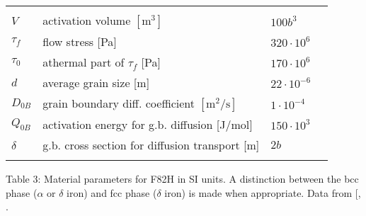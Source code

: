 \documentclass[letterpaper,10pt,english]{jupyterBook}
\begin{document}
\begin{savenotes}
\begin{tabulary}{\linewidth}[t]{TTTT}
			\sphinxAtStartPar
			\sphinxhyphen{}
			\\
			\sphinxhline
			\sphinxAtStartPar
			\(V\)
			&
			\sphinxAtStartPar
			activation volume \(\left[\mathrm{m}^3\right]\)
			&
			\sphinxAtStartPar
			\(100b^3\)
			&
			\sphinxAtStartPar
			\sphinxhyphen{}
			\\
			\sphinxhline
			\sphinxAtStartPar
			\(\tau_f\)
			&
			\sphinxAtStartPar
			flow stress {[}Pa{]}
			&
			\sphinxAtStartPar
			\(320 \cdot 10^{6}\)
			&
			\sphinxAtStartPar
			\sphinxhyphen{}
			\\
			\sphinxhline
			\sphinxAtStartPar
			\(\tau_0\)
			&
			\sphinxAtStartPar
			athermal part of \(\tau_f\) {[}Pa{]}
			&
			\sphinxAtStartPar
			\(170 \cdot 10^{6}\)
			&
			\sphinxAtStartPar
			\sphinxhyphen{}
			\\
			\sphinxhline
			\sphinxAtStartPar
			\(d\)
			&
			\sphinxAtStartPar
			average grain size {[}m{]}
			&
			\sphinxAtStartPar
			\(22 \cdot 10^{-6}\)
			&
			\sphinxAtStartPar
			\sphinxhyphen{}
			\\
			\sphinxhline
			\sphinxAtStartPar
			\(D_{0B}\)
			&
			\sphinxAtStartPar
			grain boundary diff. coefficient \(\left[\mathrm{m}^2/\mathrm{s}\right]\)
			&
			\sphinxAtStartPar
			\(1 \cdot 10^{-4}\)
			&
			\sphinxAtStartPar
			\sphinxhyphen{}
			\\
			\sphinxhline
			\sphinxAtStartPar
			\(Q_{0B}\)
			&
			\sphinxAtStartPar
			activation energy for g.b. diffusion {[}J/mol{]}
			&
			\sphinxAtStartPar
			\(150 \cdot 10^{3}\)
			&
			\sphinxAtStartPar
			\sphinxhyphen{}
			\\
			\sphinxhline
			\sphinxAtStartPar
			\(\delta\)
			&
			\sphinxAtStartPar
			g.b. cross section for diffusion transport {[}m{]}
			&
			\sphinxAtStartPar
			\(2b\)
			&
			\sphinxAtStartPar
			\sphinxhyphen{}
			\\
			\sphinxbottomrule
		\end{tabulary}
		\sphinxtableafterendhook\par
		\sphinxattableend\end{savenotes}
	
	\sphinxAtStartPar
	Table 3: Material parameters for F82H in SI units. A distinction between the bcc phase (\(\alpha\) or \(\delta\) iron) and fcc phase (\(\delta\) iron) is made when appropriate. Data from {[}, \sphinxhref{https://defmech.engineering.dartmouth.edu}{Frost1982}{]}.
	
\end{document}
